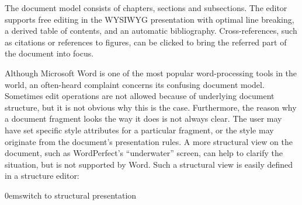 \documentclass{entcs}
\begin{document}

The document model consists of chapters, sections and subsections. The editor supports free editing in the WYSIWYG presentation with optimal line breaking, a derived table of contents, and an automatic bibliography. Cross-references, such as citations or references to figures, can be clicked to bring the referred part of the document into focus.


Although Microsoft Word is one of the most popular word-processing tools in the world, an often-heard complaint concerns its confusing document model. Sometimes edit operations are not allowed because of underlying document structure, but it is not obvious why this is the case. Furthermore, the reason why a document fragment looks the way it does is not always clear. The user may have set specific style attributes for a particular fragment, or the style may originate from the document's presentation rules. A more structural view on the document, such as WordPerfect's ``underwater'' screen, can help to clarify the situation, but is not supported by Word. Such a structural view is easily defined in a structure editor:



{0em}{\small switch to structural presentation}
\end{document}
